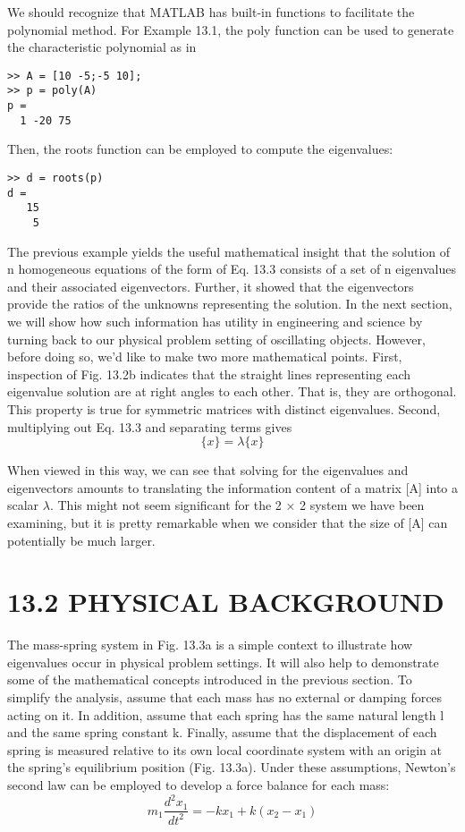 \documentclass[../main.tex]{subfiles}
\begin{document}
We should recognize that MATLAB has built-in functions to facilitate the polynomial
method. For Example 13.1, the poly function can be used to generate the characteristic
polynomial as in

\begin{lstlisting}[numbers=none]
>> A = [10 -5;-5 10];
>> p = poly(A)
p =
  1 -20 75
\end{lstlisting}

Then, the roots function can be employed to compute the eigenvalues:
\begin{lstlisting}[numbers=none]
>> d = roots(p)
d =
   15
    5
\end{lstlisting}


The previous example yields the useful mathematical insight that the solution of n
homogeneous equations of the form of Eq. 13.3 consists of a set of n eigenvalues and their
associated eigenvectors. Further, it showed that the eigenvectors provide the ratios of the
unknowns representing the solution. In the next section, we will show how such information has utility in engineering and
science by turning back to our physical problem setting of oscillating objects. However,
before doing so, we’d like to make two more mathematical points.
First, inspection of Fig. 13.2b indicates that the straight lines representing each eigenvalue solution are at right angles to each other. That is, they are orthogonal. This property
is true for symmetric matrices with distinct eigenvalues.
Second, multiplying out Eq. 13.3 and separating terms gives
\begin{equation}
[A]\{x\}=\lambda\{x\}
\end{equation}

When viewed in this way, we can see that solving for the eigenvalues and eigenvectors
amounts to translating the information content of a matrix [A] into a scalar $\lambda$. This might
not seem significant for the 2 × 2 system we have been examining, but it is pretty remarkable when we consider that the size of [A] can potentially be much larger.


\section*{13.2 PHYSICAL BACKGROUND}
The mass-spring system in Fig. 13.3a is a simple context to illustrate how eigenvalues occur
in physical problem settings. It will also help to demonstrate some of the mathematical
concepts introduced in the previous section.
To simplify the analysis, assume that each mass has no external or damping forces
acting on it. In addition, assume that each spring has the same natural length l and the same
spring constant k. Finally, assume that the displacement of each spring is measured relative
to its own local coordinate system with an origin at the spring’s equilibrium position
(Fig. 13.3a). Under these assumptions, Newton’s second law can be employed to develop
a force balance for each mass:
\begin{equation}
m_{1}\frac{d^{2}x_{1}}{dt^{2}}=-kx_{1}+k(x_{2}-x_{1})\tag{13.8a}
\end{equation}
\end{document}

